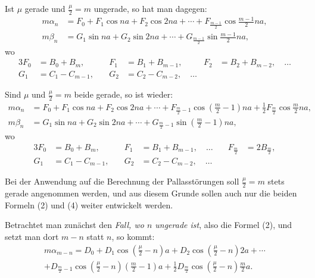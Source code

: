 \documentclass[12pt,a4paper]{article}
\begin{document}
Ist $\mu$ gerade und $\frac{\mu}{2} = m$ ungerade, so hat man dagegen:
\begin{equation}
\tag{3}
\begin{aligned}
m\alpha_n &= F_0 + F_1 \cos na + F_2 \cos 2na + \cdots + F_{\frac{m-1}{2}} \cos\tfrac{m-1}{2}na,\\
m\beta_n &= G_1 \sin na + G_2 \sin 2na + \cdots + G_{\frac{m-1}{2}} \sin\tfrac{m-1}{2}na,
\end{aligned}
\end{equation}
wo
\begin{alignat*}{3}
F_0 &= B_0 + B_m, \quad & F_1 &= B_1 + B_{m-1}, \quad & F_2 &= B_2 + B_{m-2}, \quad \ldots\\
G_1 &= C_1 - C_{m-1}, \quad & G_2 &= C_2 - C_{m-2}, \quad \ldots
\end{alignat*}

Sind $\mu$ und $\frac{\mu}{2} = m$ beide gerade, so ist wieder:
\begin{equation}
\tag{4}
\begin{aligned}
m\alpha_n &= F_0 + F_1 \cos na + F_2 \cos 2na + \cdots + F_{\frac{m}{2}-1} \cos(\tfrac{m}{2}-1)na + \tfrac{1}{2}F_{\frac{m}{2}} \cos\tfrac{m}{2}na,\\
m\beta_n &= G_1 \sin na + G_2 \sin 2na + \cdots + G_{\frac{m}{2}-1} \sin(\tfrac{m}{2}-1)na,
\end{aligned}
\end{equation}
wo
\begin{alignat*}{3}
F_0 &= B_0 + B_m, \quad & F_1 &= B_1 + B_{m-1}, \quad \ldots \quad & F_{\frac{m}{2}} &= 2B_{\frac{m}{2}},\\
G_1 &= C_1 - C_{m-1}, \quad & G_2 &= C_2 - C_{m-2}, \quad \ldots
\end{alignat*}

Bei der Anwendung auf die Berechnung der Pallasstörungen soll $\frac{\mu}{2} = m$ stets gerade angenommen werden, und aus diesem Grunde sollen auch nur die beiden Formeln (2) und (4) weiter entwickelt werden.

Betrachtet man zunächst den \textit{Fall, wo $n$ ungerade ist}, also die Formel (2), und setzt man dort $m-n$ statt $n$, so kommt:
\begin{multline*}
m\alpha_{m-n} = D_0 + D_1 \cos(\tfrac{\mu}{2}-n)a + D_2 \cos(\tfrac{\mu}{2}-n)2a + \cdots \\ + D_{\frac{m}{2}-1} \cos(\tfrac{\mu}{2}-n)(\tfrac{m}{2}-1)a + \tfrac{1}{2}D_{\frac{m}{2}} \cos(\tfrac{\mu}{2}-n)\tfrac{m}{2}a.
\end{multline*}
\end{document}
